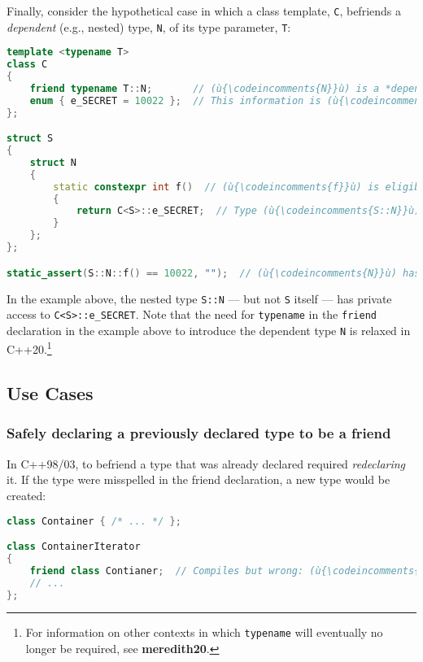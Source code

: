 Finally, consider the hypothetical case in which a class template,
\texttt{C}, befriends a \emph{dependent} (e.g., nested) type, \texttt{N},
of its type parameter, \texttt{T}:

\begin{lstlisting}[language=C++]
template <typename T>
class C
{
    friend typename T::N;       // (ù{\codeincomments{N}}ù) is a *dependent* *type* of parameter (ù{\codeincomments{T}}ù).
    enum { e_SECRET = 10022 };  // This information is (ù{\codeincomments{private}}ù) to class (ù{\codeincomments{C}}ù).
};

struct S
{
    struct N
    {
        static constexpr int f()  // (ù{\codeincomments{f}}ù) is eligible for compile-time computation.
        {
            return C<S>::e_SECRET;  // Type (ù{\codeincomments{S::N}}ù) is a (ù{\codeincomments{friend}}ù) of (ù{\codeincomments{C<S>}}ù).
        }
    };
};

static_assert(S::N::f() == 10022, "");  // (ù{\codeincomments{N}}ù) has (ù{\codeincomments{private}}ù) access to (ù{\codeincomments{C<S>}}ù).
\end{lstlisting}
    
\noindent In the example above, the nested type \texttt{S::N} --- but not
\texttt{S} itself --- has private access to \texttt{C<S>::e\_SECRET}.
Note that the need for \texttt{typename} in the \texttt{friend}
declaration in the example above to introduce the dependent type \texttt{N} is relaxed
in C++20.{\cprotect\footnote{For information on other contexts in which
\texttt{typename} will eventually no longer be required, see
  \mbox{\textbf{meredith20}}.}}

\subsection[Use Cases]{Use Cases}\label{use-cases}

\subsubsection[Safely declaring a previously declared type to be a friend]{Safely declaring a previously declared type to be a friend}\label{safely-declaring-a-previously-declared-type-to-be-a-friend}

In C++98/03, to befriend a type that was already declared required
\emph{redeclaring} it. If the type were misspelled in the friend
declaration, a new type would be created:

\begin{lstlisting}[language=C++]
class Container { /* ... */ };

class ContainerIterator
{
    friend class Contianer;  // Compiles but wrong: (ù{\codeincomments{ia}}ù) should have been (ù{\codeincomments{ai}}ù).
    // ...
};
\end{lstlisting}
    
